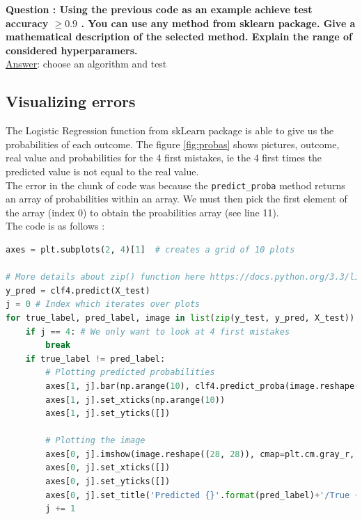 \textbf{Question : Using the previous code as an example achieve test accuracy  $\geq0.9$ . You can use any method from sklearn package. Give a mathematical description of the selected method. Explain the range of considered hyperparamers.}\\
\underline{Answer}: choose an algorithm and test \\

\subsection{Visualizing errors}
The Logistic Regression function from skLearn package is able to give us the probabilities of each outcome. The figure \ref{fig:probas} shows pictures, outcome, real value and probabilities for the 4 first mistakes, ie the 4 first times the predicted value is not equal to the real value. \\
 
The error in the chunk of code was because the \verb|predict_proba| method returns an array of probabilities within an array. We must then pick the first element of the array (index 0) to obtain the proabilities array (see line 11).\\

The code is as follows :
 
\begin{lstlisting}[language=Python]
axes = plt.subplots(2, 4)[1]  # creates a grid of 10 plots

# More details about zip() function here https://docs.python.org/3.3/library/functions.html#zip
y_pred = clf4.predict(X_test)
j = 0 # Index which iterates over plots
for true_label, pred_label, image in list(zip(y_test, y_pred, X_test)):
    if j == 4: # We only want to look at 4 first mistakes
        break
    if true_label != pred_label:
        # Plotting predicted probabilities
        axes[1, j].bar(np.arange(10), clf4.predict_proba(image.reshape(1, -1))[0]) 
        axes[1, j].set_xticks(np.arange(10))
        axes[1, j].set_yticks([])
        
        # Plotting the image
        axes[0, j].imshow(image.reshape((28, 28)), cmap=plt.cm.gray_r, interpolation='nearest')
        axes[0, j].set_xticks([])
        axes[0, j].set_yticks([])
        axes[0, j].set_title('Predicted {}'.format(pred_label)+'/True {}'.format(true_label),fontsize=8)
        j += 1
\end{lstlisting}


